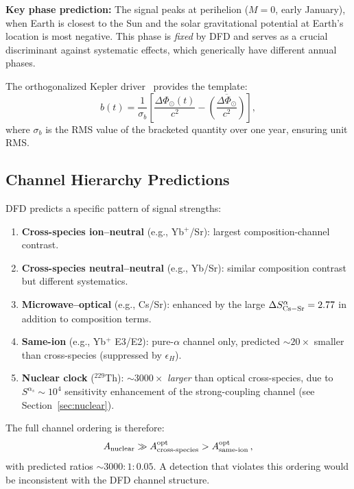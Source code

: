 \documentclass[twocolumn,showpacs,preprintnumbers,amsmath,amssymb,prd]{revtex4-2}
\begin{document}
\textbf{Key phase prediction:} The signal peaks at perihelion
($M = 0$, early January), when Earth is closest to the Sun and the
solar gravitational potential at Earth's location is most negative.
This phase is \emph{fixed} by DFD and serves as a crucial
discriminant against systematic effects, which generically have
different annual phases.

The orthogonalized Kepler driver~\cite{Alcock2025_ROCIT} provides
the template:
\begin{equation}\label{eq:driver}
b(t) = \frac{1}{\sigma_b}\left[
  \frac{\Delta\Phi_\odot(t)}{c^2}
  - \overline{\left(\frac{\Delta\Phi_\odot}{c^2}\right)}
\right],
\end{equation}
where $\sigma_b$ is the RMS value of the bracketed quantity over
one year, ensuring unit RMS.

\subsection{Channel Hierarchy Predictions}

DFD predicts a specific pattern of signal strengths:
\begin{enumerate}
\item \textbf{Cross-species ion--neutral} (e.g., Yb$^+$/Sr):
  largest composition-channel contrast.

\item \textbf{Cross-species neutral--neutral} (e.g., Yb/Sr):
  similar composition contrast but different systematics.

\item \textbf{Microwave--optical} (e.g., Cs/Sr): enhanced by
  the large $\Delta S^\alpha_{\rm Cs-Sr} = 2.77$ in addition to
  composition terms.

\item \textbf{Same-ion} (e.g., Yb$^+$ E3/E2): pure-$\alpha$
  channel only, predicted $\sim 20\times$ smaller than
  cross-species (suppressed by $\epsilon_H$).

\item \textbf{Nuclear clock} ($^{229}$Th): $\sim 3000\times$
  \emph{larger} than optical cross-species, due to
  $S^{\alpha_s} \sim 10^4$ sensitivity enhancement of the
  strong-coupling channel (see Section~\ref{sec:nuclear}).
\end{enumerate}

The full channel ordering is therefore:
\begin{equation}\label{eq:full-ordering}
A_{\rm nuclear} \gg A_{\rm cross\text{-}species}^{\rm opt}
> A_{\rm same\text{-}ion}^{\rm opt}\,,
\end{equation}
with predicted ratios $\sim 3000:1:0.05$.
A detection that violates this ordering would be inconsistent with
the DFD channel structure.
\end{document}
